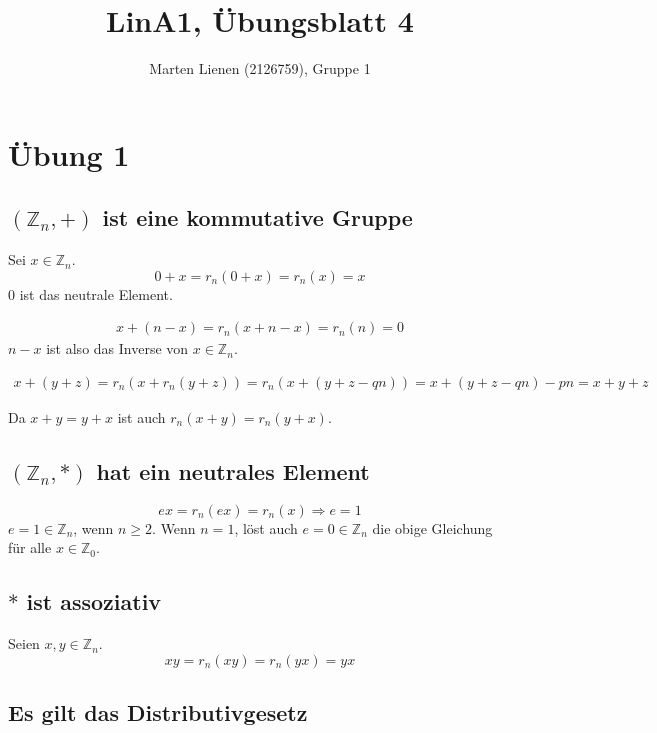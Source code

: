 \documentclass[a4paper,10pt]{article}
\title{LinA1, Übungsblatt 4}
\author{Marten Lienen (2126759), Gruppe 1}
\begin{document}
\maketitle

\section*{Übung 1}

\subsection*{$(\mathbb{Z}_n, +)$ ist eine kommutative Gruppe}

Sei $x \in \mathbb{Z}_n$.
\begin{equation*}
 0 + x = r_n(0 + x) = r_n(x) = x
\end{equation*}
$0$ ist das neutrale Element.

\begin{align*}
 x + (n - x) = r_n(x + n - x) = r_n(n) = 0
\end{align*}
$n - x$ ist also das Inverse von $x \in \mathbb{Z}_n$.

\begin{align*}
 x + (y + z) = r_n(x + r_n(y + z)) = r_n(x + (y + z - qn)) = x + (y + z - qn) - pn = x + y + z
\end{align*}

Da $x + y = y + x$ ist auch $r_n(x + y) = r_n(y + x)$.

\subsection*{$(\mathbb{Z}_n, *)$ hat ein neutrales Element}

\begin{equation*}
 ex = r_n(ex) = r_n(x) \Rightarrow e = 1
\end{equation*}
$e = 1 \in \mathbb{Z}_n$, wenn $n \ge 2$.
Wenn $n = 1$, löst auch $e = 0 \in \mathbb{Z}_n$ die obige Gleichung für alle $x \in \mathbb{Z}_0$.

\subsection*{$*$ ist assoziativ}

Seien $x, y \in \mathbb{Z}_n$.
\begin{equation*}
 xy = r_n(xy) = r_n(yx) = yx
\end{equation*}

\subsection*{Es gilt das Distributivgesetz}
\end{document}
